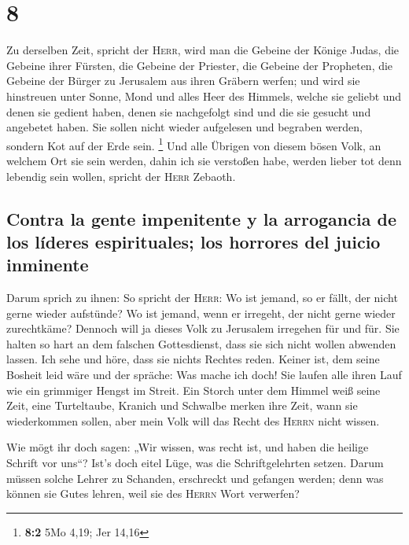 \hypertarget{section-7}{%
\section{8}\label{section-7}}

 Zu derselben Zeit, spricht der \textsc{Herr}, wird man
die Gebeine der Könige Judas, die Gebeine ihrer Fürsten, die Gebeine der
Priester, die Gebeine der Propheten, die Gebeine der Bürger zu Jerusalem
aus ihren Gräbern werfen;  und wird sie hinstreuen unter
Sonne, Mond und alles Heer des Himmels, welche sie geliebt und denen sie
gedient haben, denen sie nachgefolgt sind und die sie gesucht und
angebetet haben. Sie sollen nicht wieder aufgelesen und begraben werden,
sondern Kot auf der Erde sein. \footnote{\textbf{8:2} 5Mo 4,19; Jer
  14,16}  Und alle Übrigen von diesem bösen Volk, an
welchem Ort sie sein werden, dahin ich sie verstoßen habe, werden lieber
tot denn lebendig sein wollen, spricht der \textsc{Herr} Zebaoth.

\hypertarget{contra-la-gente-impenitente-y-la-arrogancia-de-los-luxedderes-espirituales-los-horrores-del-juicio-inminente}{%
\subsection{Contra la gente impenitente y la arrogancia de los líderes
espirituales; los horrores del juicio
inminente}\label{contra-la-gente-impenitente-y-la-arrogancia-de-los-luxedderes-espirituales-los-horrores-del-juicio-inminente}}

 Darum sprich zu ihnen: So spricht der \textsc{Herr}: Wo
ist jemand, so er fällt, der nicht gerne wieder aufstünde? Wo ist
jemand, wenn er irregeht, der nicht gerne wieder zurechtkäme?
 Dennoch will ja dieses Volk zu Jerusalem irregehen für
und für. Sie halten so hart an dem falschen Gottesdienst, dass sie sich
nicht wollen abwenden lassen.  Ich sehe und höre, dass sie
nichts Rechtes reden. Keiner ist, dem seine Bosheit leid wäre und der
spräche: Was mache ich doch! Sie laufen alle ihren Lauf wie ein
grimmiger Hengst im Streit.  Ein Storch unter dem Himmel
weiß seine Zeit, eine Turteltaube, Kranich und Schwalbe merken ihre
Zeit, wann sie wiederkommen sollen, aber mein Volk will das Recht des
\textsc{Herrn} nicht wissen.

 Wie mögt ihr doch sagen: „Wir wissen, was recht ist, und
haben die heilige Schrift vor uns``? Ist's doch eitel Lüge, was die
Schriftgelehrten setzen.  Darum müssen solche Lehrer zu
Schanden, erschreckt und gefangen werden; denn was können sie Gutes
lehren, weil sie des \textsc{Herrn} Wort verwerfen?

